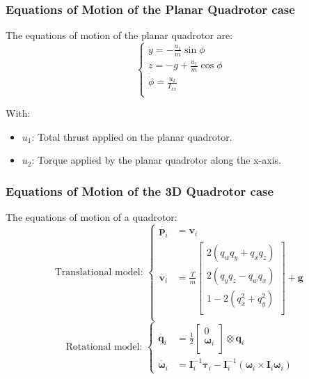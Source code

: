 \documentclass{thesisbeamer}
\newcommand\Fontvi{\fontsize{9}{10}\selectfont}
\begin{document}
\begin{frame}
	\frametitle{Equations of Motion of the Planar Quadrotor case}
	\Fontvi
	
	The equations of motion of the planar quadrotor are:
	\begin{equation}\label{dynamics_planar_quadrotor}
 \begin{cases} 
       \ddot{y} = - \frac{u_1}{m} \sin{\phi} \\
       \ddot{z} = - g + \frac{u_1}{m} \cos{\phi} \\
       \ddot{\phi} = \frac{u_2}{I_{xx}} \\
   \end{cases}
\end{equation}

With: 

\begin{itemize}
	\item $u_1$: Total thrust applied on the planar quadrotor.
	\item $u_2$: Torque applied by the planar quadrotor along the x-axis.
\end{itemize}

\end{frame}



\begin{frame}
	\frametitle{Equations of Motion of the 3D Quadrotor case}
	\Fontvi
	
	The equations of motion of a quadrotor:
	$$
	\text{Translational model: }\left\{
	\begin{array}{ll}				
		\dot{\bm{p}_i} &= \bm{v}_i \\
		\dot{\bm{v}_i} &= 
		\frac{T}{m} 
		\begin{bmatrix}
		2 (q_w q_y + q_x q_z) \\
		2 (q_y q_z - q_w q_x) \\
		1 - 2(q_x^2 + q_y^2 ) \\
		\end{bmatrix} + \bm{g} \\	
	\end{array}
	\right.
	$$
	$$
	\text{Rotational model: }\left\{
	\begin{array}{ll}		
		\dot{\bm{q}_i} & = \frac{1}{2}
		\begin{bmatrix}
		0 \\
		\bm{\omega}_i \\
		\end{bmatrix} \otimes \bm{q}_i \\
		\dot{\bm{\omega}_i} &= \bm{I}_i^{-1} \bm{\tau}_i - \bm{I}_i^{-1} (\bm{\omega}_i \times \bm{I}_i \bm{\omega}_i)
		\end{array}
		\right.
	$$
		\end{frame}
\end{document}
